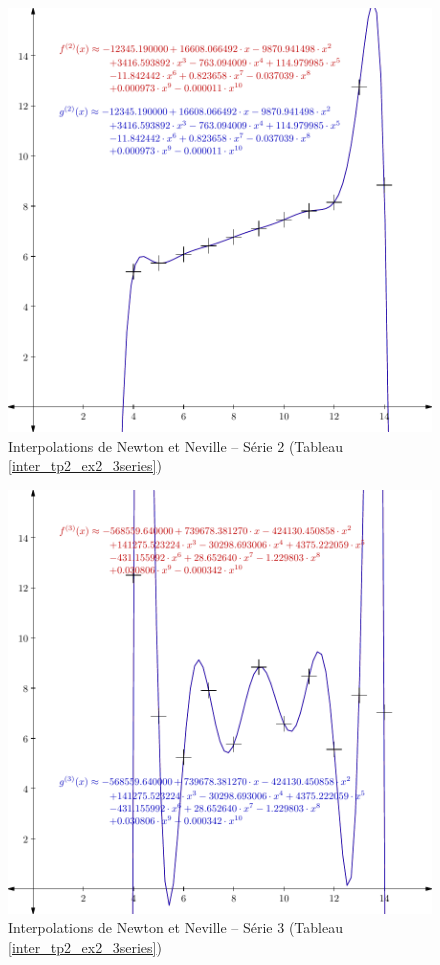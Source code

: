 \documentclass{report}
\begin{document}
	\begin{figure}[h]
	  \centering
	  \includegraphics[scale=0.5]{graphiques/pdf_output/inter_tp2_ex2_2.pdf}
	  \caption{Interpolations de Newton et Neville -- Série 2 (Tableau \ref{inter_tp2_ex2_3series})}
	\end{figure}
	\newpage
	\begin{figure}[h]
	  \centering
 	  \includegraphics[scale=0.5]{graphiques/pdf_output/inter_tp2_ex2_3.pdf}
	  \caption{Interpolations de Newton et Neville -- Série 3 (Tableau \ref{inter_tp2_ex2_3series})}
	\end{figure}
      \newpage
\end{document}
